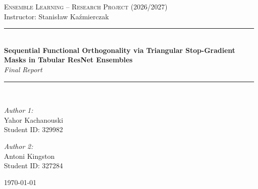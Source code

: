 \documentclass[11pt, a4paper]{article}
\begin{document}
\begin{titlepage}
    \centering
    \vspace*{2cm}

    {\Large \textsc{Ensemble Learning -- Research Project (2026/2027)}}\\[0.5cm]
    {\large Instructor: Stanisław Kaźmierczak}\\[3cm]

    \rule{\linewidth}{0.5mm} \\[0.4cm]
    {\huge \bfseries Sequential Functional Orthogonality via Triangular Stop-Gradient Masks in Tabular ResNet Ensembles \\[0.2cm] }
    {\Large \textit{Final Report}}
    \rule{\linewidth}{0.5mm} \\[2.5cm]

    \begin{minipage}{0.45\textwidth}
        \begin{flushleft} \large
            \emph{Author 1:}\\
            {Yahor Kachanouski}\\
            {\small Student ID: 329982}\\
        \end{flushleft}
    \end{minipage}
    \hfill
    \begin{minipage}{0.45\textwidth}
        \begin{flushright} \large
            \emph{Author 2:}\\
            {Antoni Kingston}\\
            {\small Student ID: 327284}\\
        \end{flushright}
    \end{minipage}

    \vfill

    {\large \today}

\end{titlepage}

\begin{abstract}
\end{abstract}
\newpage
\end{document}
